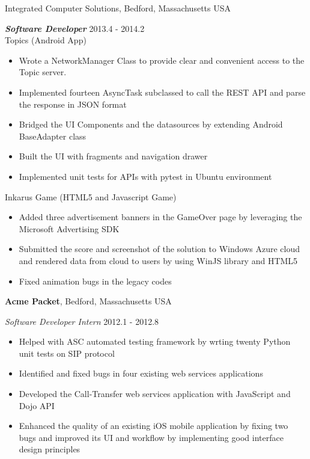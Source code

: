 \documentclass[margin,line]{res}
\begin{document}
\begin{resume}
{Integrated Computer Solutions}, Bedford, Massachusetts USA

\vspace{-.3cm}
{\em {\bf Software Developer}} \hfill {2013.4 - 2014.2}\\
Topics (Android App)
\begin{itemize}
\item Wrote a NetworkManager Class to provide clear and convenient access to the Topic server.
\item Implemented fourteen AsyncTask subclassed to call the REST API and parse the response
in JSON format
\item Bridged the UI Components and the datasources by extending Android BaseAdapter class
\item Built the UI with fragments and navigation drawer
\item Implemented unit tests for APIs with pytest in Ubuntu environment
\end{itemize}

Inkarus Game (HTML5 and Javascript Game)
\begin{itemize}
\item Added three advertisement banners in the GameOver page by leveraging 
the Microsoft Advertising SDK
\item Submitted the score and screenshot of the solution to Windows Azure cloud
and rendered data from cloud to users by using WinJS library and HTML5
\item Fixed animation bugs in the legacy codes
\end{itemize}

{\bf Acme Packet}, Bedford, Massachusetts USA

\vspace{-.3cm}
{\em Software Developer Intern} \hfill {2012.1 - 2012.8}\\
\begin{itemize}
\item Helped with ASC automated testing framework by wrting twenty Python unit tests on SIP protocol
\item Identified and fixed bugs in four existing web services applications
\item Developed the Call-Transfer web services application with JavaScript and Dojo API
\item Enhanced the quality of an existing iOS mobile application by fixing two bugs and improved its UI and
workflow by implementing good interface design principles 
\end{itemize}


\end{resume}
\end{document}
